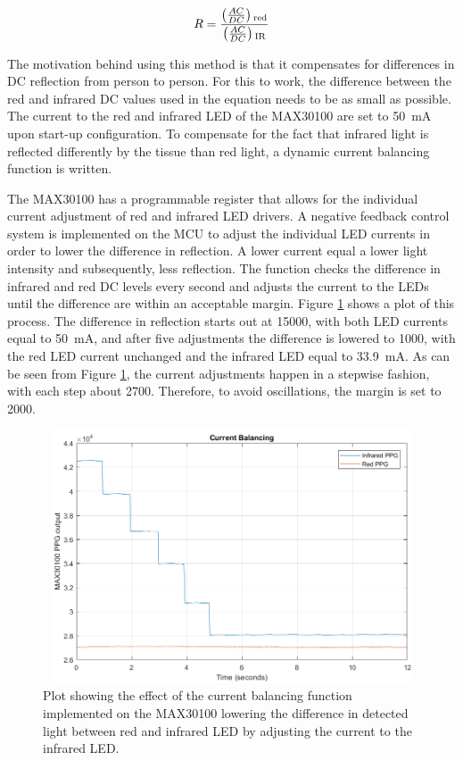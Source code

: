 \begin{equation}
\label{eq:SatsRatio}
R = \frac{\left(\frac{AC}{DC}\right)\textsubscript{red}}{\left(\frac{AC}{DC}\right)\textsubscript{IR}}
\end{equation}

The motivation behind using this method is that it compensates for differences in DC reflection from person to person. For this to work, the difference between the red and infrared DC values used in the equation needs to be as small as possible. The current to the red and infrared LED of the MAX30100 are set to \SI{50}{\milli\ampere} upon start-up configuration. To compensate for the fact that infrared light is reflected differently by the tissue than red light, a dynamic current balancing function is written.

\medskip

The MAX30100 has a programmable register that allows for the individual current adjustment of red and infrared LED drivers. A negative feedback control system is implemented on the MCU to adjust the individual LED currents in order to lower the difference in reflection. A lower current equal a lower light intensity and subsequently, less reflection. The function checks the difference in infrared and red DC levels every second and adjusts the current to the LEDs until the difference are within an acceptable margin. Figure \ref{fig:CurrentBalancing} shows a plot of this process. The difference in reflection starts out at 15000, with both LED currents equal to \SI{50}{\milli\ampere}, and after five adjustments the difference is lowered to 1000, with the red LED current unchanged and the infrared LED equal to \SI{33.9}{\milli\ampere}. As can be seen from Figure \ref{fig:CurrentBalancing}, the current adjustments happen in a stepwise fashion, with each step about 2700. Therefore, to avoid oscillations, the margin is set to 2000.

\begin{figure}[H]
   \centering
   \includegraphics[width=12cm,height=7.5cm]{figs/CurrentBalancing.png}
   \caption{Plot showing the effect of the current balancing function implemented on the MAX30100 lowering the difference in detected light between red and infrared LED by adjusting the current to the infrared LED.}
   \label{fig:CurrentBalancing}
\end{figure}

